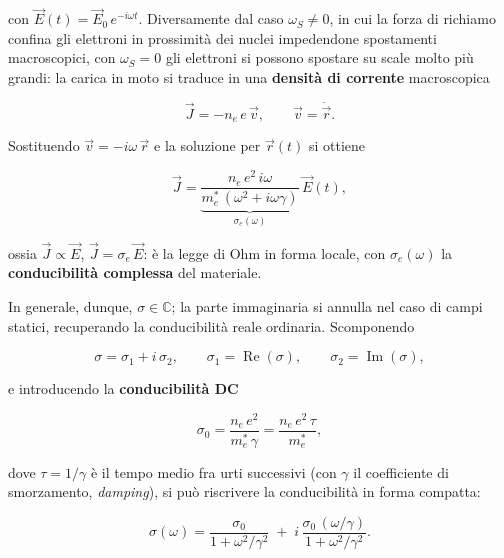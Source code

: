 con \( \vec{E}(t) = \vec{E}_0 \, e^{-i\omega t} \). Diversamente dal caso \( \omega_S \neq 0 \), in cui la forza di richiamo confina gli elettroni in prossimità dei nuclei impedendone spostamenti macroscopici, con \( \omega_S = 0 \) gli elettroni si possono spostare su scale molto più grandi: la carica in moto si traduce in una \textbf{densità di corrente} macroscopica

\begin{equation}
    \vec{J} = - n_e \, e \, \vec{v}, \qquad \vec{v} = \dot{\vec{r}}.
\end{equation}

Sostituendo \( \vec{v} = -i \omega \, \vec{r} \) e la soluzione per \( \vec{r}(t) \) si ottiene

\begin{importantbox}
    \begin{equation}
        \vec{J} = \underbrace{\frac{n_e \, e^{2} \, i \omega}{m_e^{*} \, (\omega^{2} + i \omega \gamma)}}_{\displaystyle \sigma_e(\omega)} \, \vec{E}(t),
    \end{equation}
\end{importantbox}

ossia \( \vec{J} \propto \vec{E} \), \( \vec{J} = \sigma_e \, \vec{E} \): è la legge di Ohm in forma locale, con \( \sigma_e(\omega) \) la \textbf{conducibilità complessa} del materiale.

In generale, dunque, \( \sigma \in \mathbb{C} \); la parte immaginaria si annulla nel caso di campi statici, recuperando la conducibilità reale ordinaria. Scomponendo

\begin{equation}
    \sigma = \sigma_1 + i \, \sigma_2, \qquad \sigma_1 = \operatorname{Re}(\sigma), \qquad \sigma_2 = \operatorname{Im}(\sigma),
\end{equation}

e introducendo la \textbf{conducibilità DC}

\begin{equation}
    \sigma_0 = \frac{n_e \, e^{2}}{m_e^{*} \, \gamma} = \frac{n_e \, e^{2} \, \tau}{m_e^{*}},
\end{equation}

dove \( \tau = 1/\gamma \) è il tempo medio fra urti successivi (con \( \gamma \) il coefficiente di smorzamento, \emph{damping}), si può riscrivere la conducibilità in forma compatta:

\begin{importantbox}
    \begin{equation}
        \sigma(\omega) = \frac{\sigma_0}{1 + \omega^{2}/\gamma^{2}} \;+\; i \, \frac{\sigma_0 \, (\omega/\gamma)}{1 + \omega^{2}/\gamma^{2}}.
    \end{equation}
\end{importantbox}

